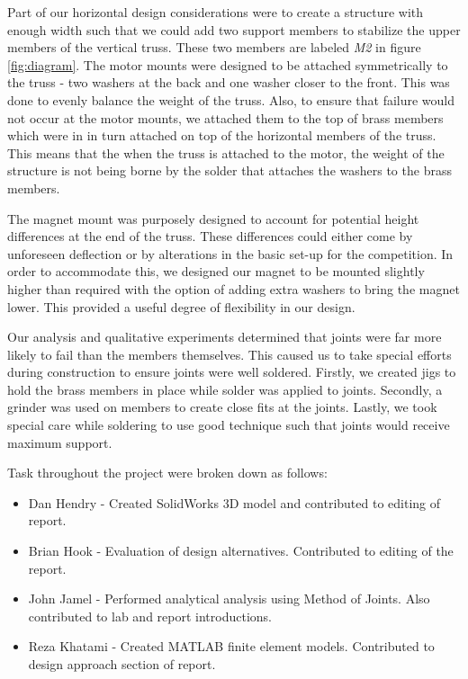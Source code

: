 Part of our horizontal design considerations were to create a structure with enough width such that we could add two support members to stabilize the upper members of the vertical truss. 
These two members are labeled \emph{M2} in figure \ref{fig:diagram}.
The motor mounts were designed to be attached symmetrically to the truss - two washers at the back and one washer closer to the front. 
This was done to evenly balance the weight of the truss. 
Also, to ensure that failure would not occur at the motor mounts, we attached them to the top of brass members which were in in turn attached on top of the horizontal members of the truss. 
This means that the when the truss is attached to the motor, the weight of the structure is not being borne by the solder that attaches the washers to the brass members.

The magnet mount was purposely designed to account for potential height differences at the end of the truss. 
These differences could either come by unforeseen deflection or by alterations in the basic set-up for the competition. 
In order to accommodate this, we designed our magnet to be mounted slightly higher than required with the option of adding extra washers to bring the magnet lower. 
This provided a useful degree of flexibility in our design.

Our analysis and qualitative experiments determined that joints were far more likely to fail than the members themselves. 
This caused us to take special efforts during construction to ensure joints were well soldered. 
Firstly, we created jigs to hold the brass members in place while solder was applied to joints. 
Secondly, a grinder was used on members to create close fits at the joints. 
Lastly, we took special care while soldering to use good technique such that joints would receive maximum support. 

Task throughout the project were broken down as follows:
\begin{itemize}
\item Dan Hendry - Created SolidWorks 3D model and contributed to editing of report.
\item Brian Hook - Evaluation of design alternatives. Contributed to editing of the report.
\item John Jamel - Performed analytical analysis using Method of Joints. Also contributed to lab and report introductions.
\item Reza Khatami - Created MATLAB finite element models. Contributed to design approach section of report.
\end{itemize}

